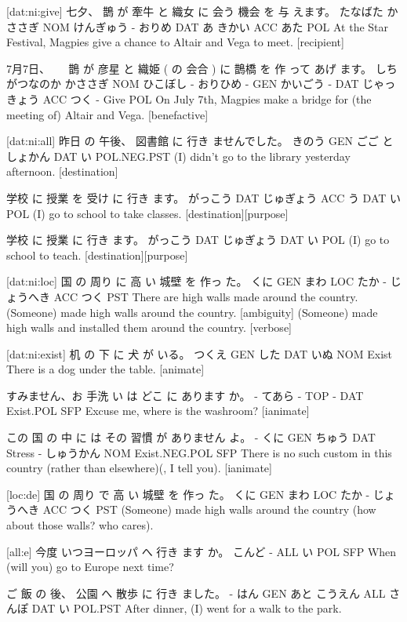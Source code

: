 [dat:ni:give]
七夕、     鵲    が    牽牛   と  織女  に  会う 機会  を   与 えます。
たなばた かささぎ NOM けんぎゅう - おりめ DAT あ  きかい ACC あた POL
At the Star Festival, Magpies give a chance to Altair and Vega to meet. [recipient]

7月7日、 　     鵲    が   彦星   と  織姫   (  の   会合  )  に   鵲橋       を  作 って あげ ます。
しちがつなのか かささぎ NOM ひこぼし - おりひめ - GEN かいごう - DAT じゃっきょう ACC つく - Give POL
On July 7th, Magpies make a bridge for (the meeting of) Altair and Vega. [benefactive]

[dat:ni:all]
昨日   の  午後、 図書館    に   行き ませんでした。
きのう GEN ごご   としょかん DAT い  POL.NEG.PST
(I) didn't go to the library yesterday afternoon. [destination]

学校    に   授業     を   受け に 行き ます。
がっこう DAT じゅぎょう ACC う  DAT い  POL
(I) go to school to take classes. [destination][purpose]

学校    に   授業      に  行き ます。
がっこう DAT じゅぎょう DAT い   POL
(I) go to school to teach. [destination][purpose]

[dat:ni:loc]
国   の  周り  に  高  い 城壁      を  作っ た。
くに GEN まわ LOC たか - じょうへき ACC つく PST
There are high walls made around the country.
(Someone) made high walls around the country. [ambiguity]
(Someone) made high walls and installed them around the country. [verbose]

[dat:ni:exist]
机    の   下  に   犬   が   いる。
つくえ GEN した DAT いぬ NOM Exist
There is a dog under the table. [animate]

すみません、お 手洗 い は どこ に  あります    か。
-          てあら - TOP -  DAT Exist.POL SFP
Excuse me, where is the washroom? [ianimate]

この 国  の   中    に    は  その 習慣     が    ありません    よ。
-  くに GEN ちゅう DAT Stress - しゅうかん NOM Exist.NEG.POL SFP
There is no such custom in this country (rather than elsewhere)(, I tell you). [ianimate]

[loc:de]
国   の  周り  で  高  い 城壁      を  作っ た。
くに GEN まわ LOC たか - じょうへき ACC つく PST
(Someone) made high walls around the country (how about those walls? who cares).

[all:e]
今度 いつヨーロッパ へ 行き ます    か。
こんど -         ALL い  POL SFP
When (will you) go to Europe next time?

ご 飯   の 後、   公園   へ   散歩  に  行き ました。
- はん GEN あと こうえん ALL さんぽ DAT い POL.PST
After dinner, (I) went for a walk to the park.

